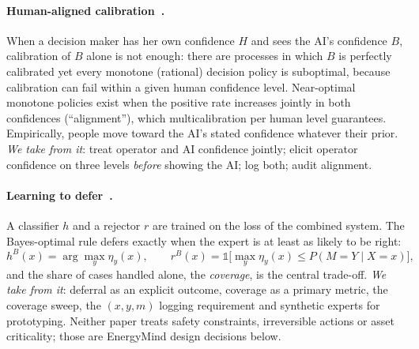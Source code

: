 \paragraph{Human-aligned calibration~\cite{benz}.} When a decision maker has her own confidence $H$ and sees the
AI's confidence $B$, calibration of $B$ alone is not enough: there are processes in which $B$ is perfectly
calibrated yet every monotone (rational) decision policy is suboptimal, because calibration can fail within a
given human confidence level. Near-optimal monotone policies exist when the positive rate increases jointly in
both confidences (``alignment''), which multicalibration per human level guarantees. Empirically, people move
toward the AI's stated confidence whatever their prior. \emph{We take from it}: treat operator and AI confidence
jointly; elicit operator confidence on three levels \emph{before} showing the AI; log both; audit alignment.

\paragraph{Learning to defer~\cite{mozannar}.} A classifier $h$ and a rejector $r$ are trained on the loss of
the combined system. The Bayes-optimal rule defers exactly when the expert is at least as likely to be right:
\begin{equation}
h^B(x)=\arg\max_y\eta_y(x),\qquad r^B(x)=\mathbb 1\bigl[\max_y\eta_y(x)\le P(M=Y\mid X=x)\bigr],
\end{equation}
and the share of cases handled alone, the \emph{coverage}, is the central trade-off. \emph{We take from it}:
deferral as an explicit outcome, coverage as a primary metric, the coverage sweep, the $(x,y,m)$ logging
requirement and synthetic experts for prototyping. Neither paper treats safety constraints, irreversible actions
or asset criticality; those are EnergyMind design decisions below.

